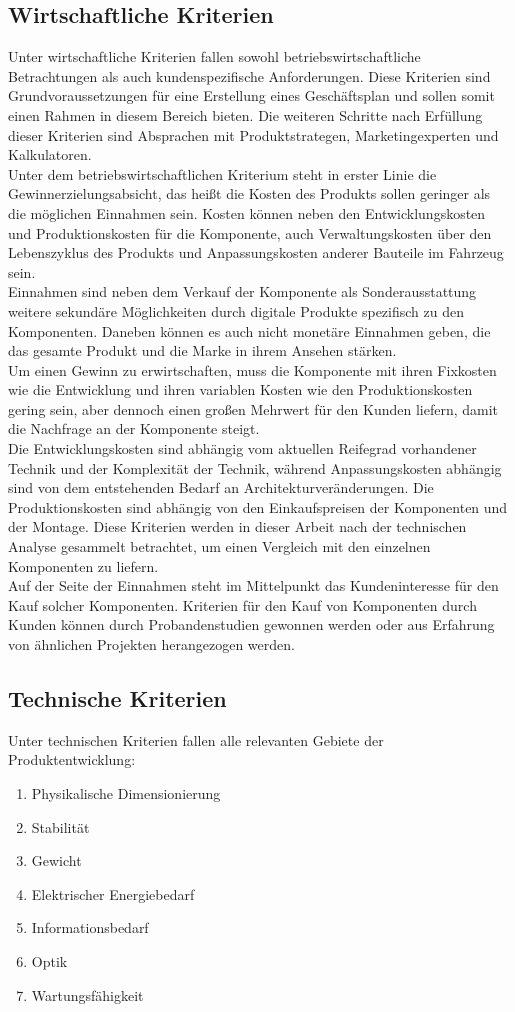 \subsection{Wirtschaftliche Kriterien}
Unter wirtschaftliche Kriterien fallen sowohl betriebswirtschaftliche Betrachtungen als auch kundenspezifische Anforderungen. Diese Kriterien sind Grundvoraussetzungen für eine Erstellung eines Geschäftsplan und sollen somit einen Rahmen in diesem Bereich bieten. Die weiteren Schritte nach Erfüllung dieser Kriterien sind Absprachen mit Produktstrategen, Marketingexperten und Kalkulatoren. \\
Unter dem betriebswirtschaftlichen Kriterium steht in erster Linie die Gewinnerzielungsabsicht, das heißt die Kosten des Produkts sollen geringer als die möglichen Einnahmen sein. Kosten können neben den Entwicklungskosten und Produktionskosten für die Komponente, auch Verwaltungskosten über den Lebenszyklus des Produkts und Anpassungskosten anderer Bauteile im Fahrzeug sein. \\
Einnahmen sind neben dem Verkauf der Komponente als Sonderausstattung weitere sekundäre Möglichkeiten durch digitale Produkte spezifisch zu den Komponenten. Daneben können es auch nicht monetäre Einnahmen geben, die das gesamte Produkt und die Marke in ihrem Ansehen stärken.\\
Um einen Gewinn zu erwirtschaften, muss die Komponente mit ihren Fixkosten wie die Entwicklung und ihren variablen Kosten wie den Produktionskosten gering sein, aber dennoch einen großen Mehrwert für den Kunden liefern, damit die Nachfrage an der Komponente steigt. \\
Die Entwicklungskosten sind abhängig vom aktuellen Reifegrad vorhandener Technik und der Komplexität der Technik, während Anpassungskosten abhängig sind von dem entstehenden Bedarf an Architekturveränderungen. Die Produktionskosten sind abhängig von den Einkaufspreisen der Komponenten und der Montage. Diese Kriterien werden in dieser Arbeit nach der technischen Analyse gesammelt betrachtet, um einen Vergleich mit den einzelnen Komponenten zu liefern. \\
Auf der Seite der Einnahmen steht im Mittelpunkt das Kundeninteresse für den Kauf solcher Komponenten. Kriterien für den Kauf von Komponenten durch Kunden können durch Probandenstudien gewonnen werden oder aus Erfahrung von ähnlichen Projekten herangezogen werden.
\subsection{Technische Kriterien}
Unter technischen Kriterien fallen alle relevanten Gebiete der Produktentwicklung:
\begin{enumerate}
	\item Physikalische Dimensionierung
	\item Stabilität
	\item Gewicht
	\item Elektrischer Energiebedarf
	\item Informationsbedarf
	\item Optik
	\item Wartungsfähigkeit
\end{enumerate}
